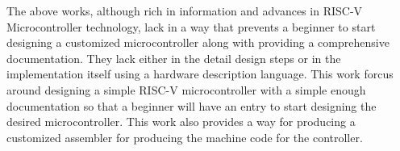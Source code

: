 The above works, although rich in information and advances in RISC-V Microcontroller technology, lack in a way that prevents a beginner to start designing a customized microcontroller along with providing a comprehensive documentation. 
They lack either in the detail design steps or in the implementation itself using a hardware description language.
This work forcus around designing a simple RISC-V microcontroller with a simple enough documentation so that a beginner will have an entry to start designing the desired 
microcontroller. This work also provides a way for producing a customized assembler for producing the machine code for the controller.
